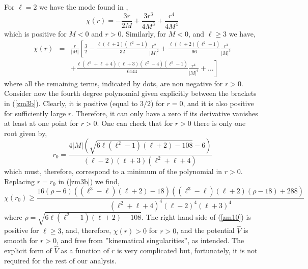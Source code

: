 \documentclass[aps,floats,showpacs,amssymb,tightenlines]{revtex4}
\begin{document}
For $\ell=2$ we have the mode found in \cite{ghi},
\begin{equation} \label{zm3a}
\chi(r)=-\frac{3r}{2M}+\frac{3r^3}{4M^3}+\frac{r^4}{4M^4}
\end{equation}
which is positive for $M<0$ and $r>0$. Similarly, for $M<0$, and $\ell \geq 3$ we have,
\begin{eqnarray} \label{zm3b}
\chi(r) & = & \frac{r}{|M|} \left[\frac{3}{2}-\frac{\ell(\ell+2)(\ell^2-1)}{32 } \frac{r^2}{|M|^2}+\frac{\ell(\ell+2)(\ell^2-1)}{96}\frac{ r^3}{|M|^3} \right.
\nonumber \\ & &\left. +
\frac{\ell(\ell^2+\ell+4)(\ell+3)(\ell^2-4)(\ell^2-1)}{6144}\frac{ r^4}{|M|^4}+\dots\right]
\end{eqnarray}
where all the remaining terms, indicated by dots, are non negative for $r>0$. Consider now the fourth degree polynomial given explicitly between the brackets in (\ref{zm3b}). Clearly, it is positive (equal to $3/2$) for $r=0$, and it is also positive for sufficiently large $r$. Therefore, it can only have a zero if its derivative vanishes at least at one point for $r>0$. One can check that for $r > 0$ there is only one root given by,
\begin{equation}\label{zm9}
r_0 = \frac{4|M|\left(\sqrt{6\ell(\ell^2-1)(\ell+2)-108}-6\right)}{(\ell-2)(\ell+3)(\ell^2+\ell+4)}
\end{equation}
which must, therefore, correspond to a minimum of the polynomial in $r > 0$.
Replacing $r=r_0$ in (\ref{zm3b}) we find,
\begin{equation}\label{zm10}
\chi(r_0) \geq \frac{16 (\rho-6)\left((\ell^3-\ell)(\ell+2)-18\right)\left((\ell^3-\ell)(\ell+2)(\rho-18)+288\right)}
{(\ell^2+\ell+4)^4(\ell-2)^4(\ell+3)^4}
\end{equation}
where $\rho=\sqrt{6\ell(\ell^2-1)(\ell+2)-108}$. The right hand side of (\ref{zm10}) is positive for $\ell \geq 3$, and, therefore, $\chi(r) > 0$  for $r >0$, and the potential $\hat V$ is smooth for $r > 0$, and free from ''kinematical singularities'', as intended. The explicit form of $\hat V$ as a function of $r$ is very complicated but, fortunately, it is not required for the rest of our analysis.
\end{document}
